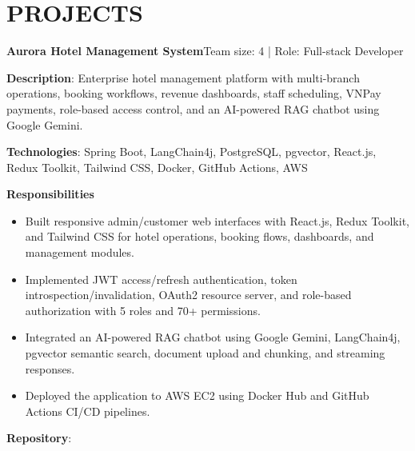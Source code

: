 \section{PROJECTS}
\resumeSubHeadingListStart

  \resumeProjectHeading
    {\textbf{Aurora Hotel Management System}}{Team size: 4 | Role: Full-stack Developer}
    \resumeItemListStart
      \item \textbf{Description}: Enterprise hotel management platform with multi-branch operations, booking workflows, revenue dashboards, staff scheduling, VNPay payments, role-based access control, and an AI-powered RAG chatbot using Google Gemini.
      \item \textbf{Technologies}: Spring Boot, LangChain4j, PostgreSQL, pgvector, React.js, Redux Toolkit, Tailwind CSS, Docker, GitHub Actions, AWS
      \item \textbf{Responsibilities}
        \begin{itemize}
          \item Built responsive admin/customer web interfaces with React.js, Redux Toolkit, and Tailwind CSS for hotel operations, booking flows, dashboards, and management modules.
          \item Implemented JWT access/refresh authentication, token introspection/invalidation, OAuth2 resource server, and role-based authorization with 5 roles and 70+ permissions.
          \item Integrated an AI-powered RAG chatbot using Google Gemini, LangChain4j, pgvector semantic search, document upload and chunking, and streaming responses.
          \item Deployed the application to AWS EC2 using Docker Hub and GitHub Actions CI/CD pipelines.
        \end{itemize}
      \item \textbf{Repository}: \href{https://github.com/nvminh162/aurora-hotel-management-system}{}
    \resumeItemListEnd

